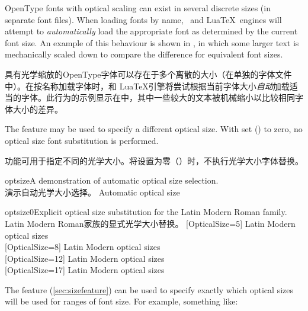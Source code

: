 \documentclass[a4paper]{l3doc}
\begin{document}
OpenType fonts with optical scaling can exist in
several discrete sizes (in separate font files).
When loading fonts by name, \XeTeX\ and Lua\TeX\ engines will attempt to
\emph{automatically} load the appropriate font as determined by the current font size.
An example of this behaviour is shown in , in which some larger text is
mechanically scaled down to compare the difference for equivalent font sizes.

具有光学缩放的OpenType字体可以存在于多个离散的大小（在单独的字体文件中）。在按名称加载字体时，\XeTeX 和 Lua\TeX 引擎将尝试根据当前字体大小\emph{自动}加载适当的字体。此行为的示例显示在中，其中一些较大的文本被机械缩小以比较相同字体大小的差异。

The  feature may be used to specify a different optical size.
With  set ()
to zero, no optical size font substitution is performed.

功能可用于指定不同的光学大小。将设置为零（）时，不执行光学大小字体替换。

\begin{Lexample}{optsize}{A demonstration of automatic optical size selection.\\演示自动光学大小选择。}
   Automatic optical size                  \\
  \scalebox{0.4}{\Huge
   Automatic optical size}
\end{Lexample}

\begin{Lexample}{optsize0}{Explicit optical size substitution for the Latin Modern Roman family.\\Latin Modern Roman家族的显式光学大小替换。}
  [OpticalSize=5]
   Latin Modern optical sizes                \\
  [OpticalSize=8]
   Latin Modern optical sizes                \\
  [OpticalSize=12]
   Latin Modern optical sizes                \\
  [OpticalSize=17]
   Latin Modern optical sizes
\end{Lexample}

The  feature (\vref{sec:sizefeature}) can be
used to specify exactly which optical sizes will be used for ranges
of font size. For example, something like:
\end{document}
